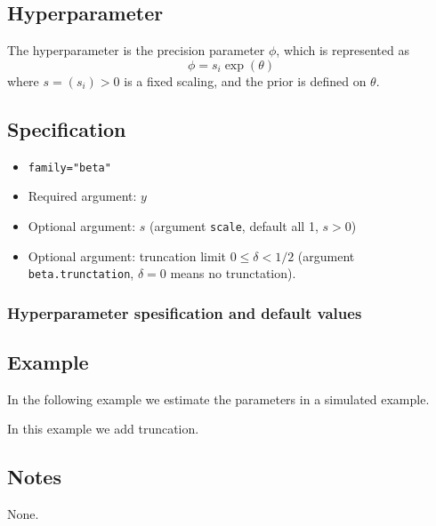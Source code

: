 \documentclass[a4paper,11pt]{article}
\begin{document}
\subsection*{Hyperparameter}

The hyperparameter is the precision parameter $\phi$, which is
represented as
\begin{displaymath}
    \phi = s_i \exp(\theta)
\end{displaymath}
where $s = (s_i) > 0$ is a fixed scaling, and the prior is defined on
$\theta$.

\subsection*{Specification}

\begin{itemize}
\item \texttt{family="beta"}
\item Required argument: $y$
\item Optional argument: $s$ (argument \texttt{scale}, default all 1, $s>0$)
\item Optional argument: truncation limit $0 \le \delta < 1/2$
    (argument \texttt{beta.trunctation}, $\delta=0$ means no trunctation).
\end{itemize}

\subsubsection*{Hyperparameter spesification and default values}



\subsection*{Example}

In the following example we estimate the parameters in a simulated
example.


In this example we add truncation.


\subsection*{Notes}

None.
\end{document}
